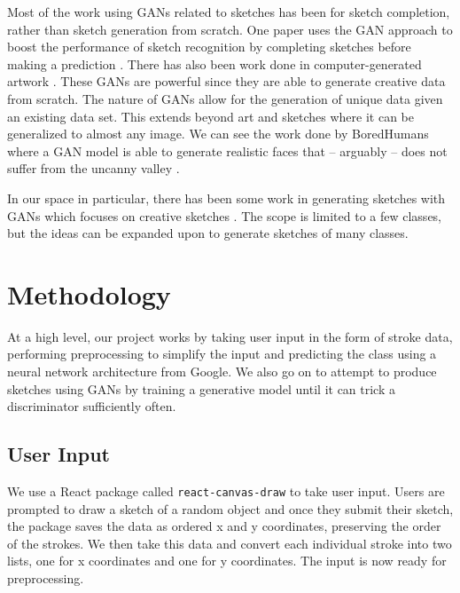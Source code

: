 \documentclass[10pt,twocolumn,letterpaper]{article}
\def\code#1{\texttt{#1}}
\begin{document}
Most of the work using GANs related to sketches has been for sketch completion, rather than sketch generation from scratch. One paper uses the GAN approach to boost the performance of sketch recognition by completing sketches before making a prediction \cite{liu2019sketchgan}. There has also been work done in computer-generated artwork \cite{mediumArticle}. These GANs are powerful since they are able to generate creative data from scratch. The nature of GANs allow for the generation of unique data given an existing data set. This extends beyond art and sketches where it can be generalized to almost any image. We can see the work done by BoredHumans where a GAN model is able to generate realistic faces that – arguably – does not suffer from the uncanny valley \cite{boredHumans}. 

In our space in particular, there has been some work in generating sketches with GANs which focuses on creative sketches \cite{ge2020creative}. The scope is limited to a few classes, but the ideas can be expanded upon to generate sketches of many classes.

\section{Methodology}

At a high level, our project works by taking user input in the form of stroke data, performing preprocessing to simplify the input and predicting the class using a neural network architecture from Google. We also go on to attempt to produce sketches using GANs by training a generative model until it can trick a discriminator sufficiently often.

\subsection{User Input}

We use a React package called \code{react-canvas-draw} \cite{react-canvas} to take user input. Users are prompted to draw a sketch of a random object and once they submit their sketch, the package saves the data as ordered x and y coordinates, preserving the order of the strokes. We then take this data and convert each individual stroke into two lists, one for x coordinates and one for y coordinates. The input is now ready for preprocessing.
\end{document}
